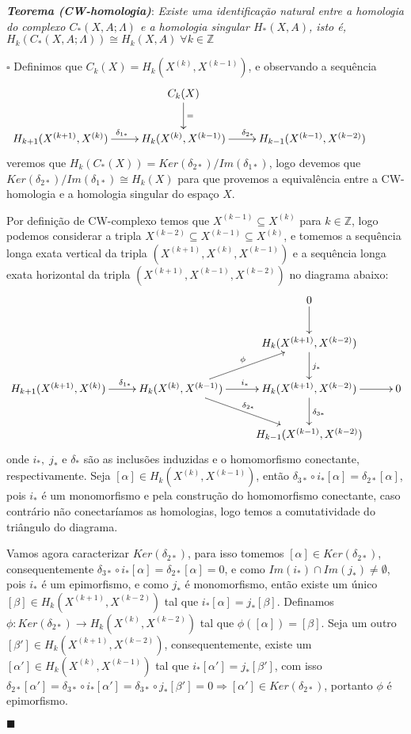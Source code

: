 \documentclass[12pt]{book}
\newcommand{\classe}[1]{[#1]}
\newcommand{\skeleton}[1]{X^{(#1)}}
\newcommand{\homologia}[2]{H_{#1}(#2)}
\newcommand{\homologiarel}[3]{H_{#1}(#2,#3)}
\newcommand{\homologiarelskele}[3]{H_{#1}(X^{(#2)}, X^{(#3)})}
\newcommand{\homologiarelskelesimpl}[2]{H_{#1}(X^{(#2)}, X^{(#2-1)})}
\newcommand{\tese}[3]{\vspace{2mm} \textit{\textbf{#1}}: \textit{#2} \par $\square$ #3 \par $\blacksquare$}
\begin{document}
	
	\tese{Teorema (CW-homologia)}{Existe uma identificação natural entre a homologia do complexo $C_{*}(X,A; \Lambda)$ e a homologia singular $\homologiarel{*}{X}{A}$, isto é, $\homologia{k}{C_{*}(X,A; \Lambda)} \cong \homologiarel{k}{X}{A}\; \forall k \in \mathbb{Z}$}
	{
	Definimos que $C_{k}(X) = \homologiarelskelesimpl{k}{k}$, e observando a sequência
	\[
	\xymatrix{
		& C_{k}(X) \ar[d]^{=}& &
		\\
		\homologiarelskele{k+1}{k+1}{k} \ar[r]^{\delta_{1*}} & \homologiarelskele{k}{k}{k-1} \ar[r]^{\delta_{2*}} & \homologiarelskele{k-1}{k-1}{k-2} &
	}
	\]
	veremos que $\homologia{k}{C_{*}(X)} = Ker(\delta_{2*})/Im(\delta_{1*})$, logo devemos que $Ker(\delta_{2*})/Im(\delta_{1*}) \cong \homologia{k}{X}$ para que provemos a equivalência entre a CW-homologia e a homologia singular do espaço $X$.
	
	\vspace{2mm} Por definição de CW-complexo temos que $\skeleton{k-1} \subseteq \skeleton{k}$ para $k \in \mathbb{Z}$, logo podemos considerar a tripla $\skeleton{k-2} \subseteq \skeleton{k-1} \subseteq \skeleton{k}$, e tomemos a sequência longa exata vertical da tripla $(\skeleton{k+1}, \skeleton{k}, \skeleton{k-1})$ e a sequência longa exata horizontal da tripla $(\skeleton{k+1}, \skeleton{k-1}, \skeleton{k-2})$  no diagrama abaixo:
	\[
	\xymatrix{
		& & 0 \ar[d] &
		\\
		& & \homologiarelskele{k}{k+1}{k-2} \ar[d]^{j_{*}} &
		\\
		\homologiarelskele{k+1}{k+1}{k} \ar[r]^{\quad\delta_{1*}} &		\homologiarelskele{k}{k}{k-1} \ar[r]^{i_{*}} \ar[rd]^{\delta_{2*}} \ar[ru]^{\phi}& \homologiarelskele{k}{k+1}{k-2} \ar[r] \ar[d]^{\delta_{3*}} & 0
		\\
		& & \homologiarelskele{k-1}{k-1}{k-2} &
	}
	\]	
	onde $i_{*}, \; j_{*}$ e $\delta_{*}$ são as inclusões induzidas e o homomorfismo conectante, respectivamente. Seja $\classe{\alpha} \in \homologiarelskelesimpl{k}{k}$, então $\delta_{3*}\circ i_{*}\classe{\alpha} = \delta_{2*}\classe{\alpha}$, pois $i_{*}$ é um monomorfismo e pela construção do homomorfismo conectante, caso contrário não conectaríamos as homologias, logo temos a comutatividade do triângulo do diagrama.
	
	\vspace{2mm} Vamos agora caracterizar $Ker(\delta_{2*})$, para isso tomemos $\classe{\alpha} \in Ker(\delta_{2*})$, consequentemente $\delta_{3*}\circ i_{*}\classe{\alpha} = \delta_{2*}\classe{\alpha} = 0$, e como $Im(i_{*})\cap Im(j_{*}) \neq \emptyset$, pois $i_{*}$ é um epimorfismo, e como $j_{*}$ é monomorfismo, então existe um único $\classe{\beta} \in \homologiarelskele{k}{k+1}{k-2}$ tal que $i_{*} \classe{\alpha} = j_{*} \classe{\beta}$. Definamos $\phi: Ker(\delta_{2*}) \to \homologiarelskele{k}{k}{k-2}$ tal que $\phi(\classe{\alpha}) = \classe{\beta}$. Seja um outro $\classe{\beta'} \in \homologiarelskele{k}{k+1}{k-2}$, consequentemente, existe um $\classe{\alpha'} \in \homologiarelskele{k}{k}{k-1}$ tal que $i_{*} \classe{\alpha'} = j_{*} \classe{\beta'}$, com isso $\delta_{2*}\classe{\alpha'} = \delta_{3*}\circ i_{*}\classe{\alpha'} = \delta_{3*}\circ j_{*}\classe{\beta'} = 0 \Rightarrow \classe{\alpha'} \in Ker(\delta_{2*})$, portanto $\phi$ é epimorfismo.
	
}
\end{document}
